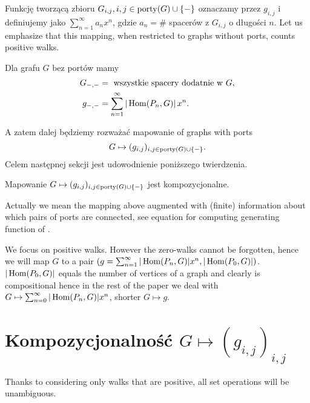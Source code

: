 Funkcję tworzącą zbioru $G_{i,j}, i,j \in \operatorname{porty}(G) \cup \{ - \}$ oznaczamy przez $g_{i,j}$ i definiujemy jako $\sum_{n=1}^{\infty} a_n x^n$, gdzie $a_n = \#$ spacerów z $G_{i,j}$ o długości $n$. 
Let us emphasize that this mapping, when restricted to graphs without ports, counts positive walks.
\begin{obs}
	Dla grafu $G$ bez portów mamy 
	\begin{align*}
	G_{-, -} & = \text{ wszystkie spacery dodatnie w $G$},\\
	g_{-, -} & = \sum_{n=1}^{\infty}| \operatorname{Hom}(P_n, G) |\ \! x^n.
	\end{align*}
\end{obs}
A zatem dalej będziemy rozważać mapowanie of graphs with ports
	\begin{equation}
		G \mapsto (g_{i, j})_{i, j \in \operatorname{porty}(G) \cup \{ - \}}.
	\end{equation}
Celem następnej sekcji jest udowodnienie poniższego twierdzenia.
\begin{tw}
	Mapowanie $G \mapsto (g_{i,j})_{i, j \in \operatorname{porty}(G) \cup \{ - \}}$ jest kompozycjonalne. 
\end{tw}
\begin{uw}
	Actually we mean the mapping above augmented with (finite) information about which pairs of ports are connected, see equation for computing generating function of \join.
\end{uw}
\begin{uw}
	We focus on positive walks. However the zero-walks cannot be forgotten, hence we will map $G$ to a pair $(g = \sum_{n = 1} ^ {\infty} |\operatorname{Hom}(P_n, G)| x^n, |\operatorname{Hom}(P_0, G)|)$. $|\operatorname{Hom}(P_0, G)|$ equals the number of vertices of a graph and clearly is compositional hence in the rest of the paper we deal with $G \mapsto \sum_{n = 0} ^ {\infty} |\operatorname{Hom}(P_n, G)| x^n$, shorter $G \mapsto g$.
\end{uw}
\section{Kompozycjonalność $G \mapsto (g_{i,j})_{i,j}$}
Thanks to considering only walks that are positive, all set operations will be unambiguous.
